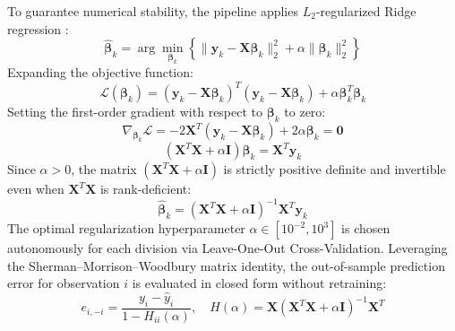 \hs To guarantee numerical stability, the pipeline applies $L_2$-regularized Ridge regression \citep{hoerl1970ridge}:
\begin{equation}
    \hat{\boldsymbol{\beta}}_k = \arg\min_{\boldsymbol{\beta}_k} \left\{ \|\mathbf{y}_k - \mathbf{X}\boldsymbol{\beta}_k\|_2^2 + \alpha \|\boldsymbol{\beta}_k\|_2^2 \right\}
\end{equation}
Expanding the objective function:
\begin{equation}
    \mathcal{L}(\boldsymbol{\beta}_k) = (\mathbf{y}_k - \mathbf{X}\boldsymbol{\beta}_k)^T (\mathbf{y}_k - \mathbf{X}\boldsymbol{\beta}_k) + \alpha \boldsymbol{\beta}_k^T \boldsymbol{\beta}_k
\end{equation}
Setting the first-order gradient with respect to $\boldsymbol{\beta}_k$ to zero:
\begin{equation}
    \nabla_{\boldsymbol{\beta}_k} \mathcal{L} = -2 \mathbf{X}^T (\mathbf{y}_k - \mathbf{X}\boldsymbol{\beta}_k) + 2\alpha \boldsymbol{\beta}_k = \mathbf{0}
\end{equation}
\begin{equation}
    (\mathbf{X}^T \mathbf{X} + \alpha \mathbf{I}) \boldsymbol{\beta}_k = \mathbf{X}^T \mathbf{y}_k
\end{equation}
Since $\alpha > 0$, the matrix $(\mathbf{X}^T \mathbf{X} + \alpha \mathbf{I})$ is strictly positive definite and invertible even when $\mathbf{X}^T \mathbf{X}$ is rank-deficient:
\begin{equation}
    \hat{\boldsymbol{\beta}}_k = (\mathbf{X}^T \mathbf{X} + \alpha \mathbf{I})^{-1} \mathbf{X}^T \mathbf{y}_k
\end{equation}
The optimal regularization hyperparameter $\alpha \in [10^{-2}, 10^3]$ is chosen autonomously for each division via Leave-One-Out Cross-Validation. Leveraging the Sherman--Morrison--Woodbury matrix identity, the out-of-sample prediction error for observation $i$ is evaluated in closed form without retraining:
\begin{equation}
    e_{i, -i} = \frac{y_i - \hat{y}_i}{1 - H_{ii}(\alpha)}, \quad H(\alpha) = \mathbf{X}(\mathbf{X}^T \mathbf{X} + \alpha \mathbf{I})^{-1}\mathbf{X}^T
\end{equation}

